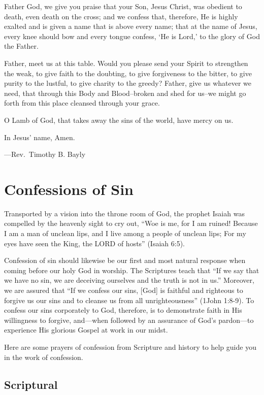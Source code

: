 \documentclass[]{book}
\begin{document}
Father God, we give you praise that your Son, Jesus Christ, was obedient
to death, even death on the cross; and we confess that, therefore, He is
highly exalted and is given a name that is above every name; that at the
name of Jesus, every knee should bow and every tongue confess, `He is
Lord,' to the glory of God the Father.

Father, meet us at this table. Would you please send your Spirit to
strengthen the weak, to give faith to the doubting, to give forgiveness
to the bitter, to give purity to the lustful, to give charity to the
greedy? Father, give us whatever we need, that through this Body and
Blood--broken and shed for us--we might go forth from this place
cleansed through your grace.

O Lamb of God, that takes away the sins of the world, have mercy on us.

In Jesus' name, Amen.

---Rev.~Timothy B. Bayly

\chapter{Confessions of Sin}\label{confessions-of-sin}

Transported by a vision into the throne room of God, the prophet Isaiah
was compelled by the heavenly sight to cry out, ``Woe is me, for I am
ruined! Because I am a man of unclean lips, and I live among a people of
unclean lips; For my eyes have seen the King, the LORD of hosts''
(Isaiah 6:5).

Confession of sin should likewise be our first and most natural response
when coming before our holy God in worship. The Scriptures teach that
``If we say that we have no sin, we are deceiving ourselves and the
truth is not in us.'' Moreover, we are assured that ``If we confess our
sins, {[}God{]} is faithful and righteous to forgive us our sins and to
cleanse us from all unrighteousness'' (1John 1:8-9). To confess our sins
corporately to God, therefore, is to demonstrate faith in His
willingness to forgive, and---when followed by an assurance of God's
pardon---to experience His glorious Gospel at work in our midst.

Here are some prayers of confession from Scripture and history to help
guide you in the work of confession.

\section{Scriptural}\label{scriptural}
\end{document}
